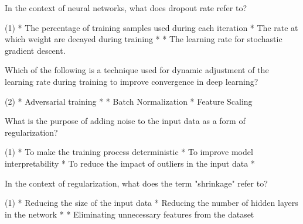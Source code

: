 \documentclass[10pt]{extarticle}
\begin{document}
\begin{exercise}
    In the context of neural networks, what does dropout rate refer to?
    \begin{choice}(1)
        * The percentage of training samples used during each iteration
        * The rate at which weight are decayed during training
        * 
        * The learning rate for stochastic gradient descent.
    \end{choice}
\end{exercise}
\begin{solution}
\end{solution}

\begin{exercise}
    Which of the following is a technique used for dynamic adjustment of the learning rate during training to improve convergence in deep learning?
    \begin{choice}(2)
        * Adversarial training
        * 
        * Batch Normalization
        * Feature Scaling
    \end{choice}
\end{exercise}
\begin{solution}
\end{solution}

\begin{exercise}
    What is the purpose of adding noise to the input data as a form of regularization?
    \begin{choice} (1)
        * To make the training process deterministic
        * To improve model interpretability
        * To reduce the impact of outliers in the input data
        * 
    \end{choice}
\end{exercise}
\begin{solution}
\end{solution}

\begin{exercise}
    In the context of regularization, what does the term "shrinkage" refer to?
    \begin{choice} (1)
        * Reducing the size of the input data
        * Reducing the number of hidden layers in the network
        * 
        * Eliminating unnecessary features from the dataset
    \end{choice}
\end{exercise}
\begin{solution}
\end{solution}
\end{document}
